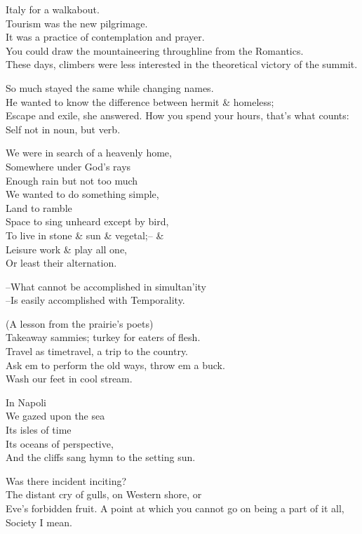 Italy for a walkabout.  \\
Tourism was the new pilgrimage. \\
It was a practice of contemplation and prayer. \\
You could draw the mountaineering throughline from the Romantics. \\
These days, climbers were less interested in the theoretical victory of the summit.

So much stayed the same while changing names. \\
He wanted to know the difference between hermit \& homeless; \\
Escape and exile, she answered.
How you spend your hours, that's what counts: \\
Self not in noun, but verb.

We were in search of a heavenly home, \\
Somewhere under God's rays \\
Enough rain but not too much \\
We wanted to do something simple, \\
Land to ramble \\
Space to sing unheard except by bird, \\
To live in stone \& sun \& vegetal;-- \& \\
Leisure work \& play all one, \\
Or least their alternation.

--What cannot be accomplished in simultan'ity \\
--Is easily accomplished with Temporality.

(A lesson from the prairie's poets) \\
Takeaway sammies; turkey for eaters of flesh. \\
Travel as timetravel, a trip to the country. \\
Ask em to perform the old ways, throw em a buck. \\
Wash our feet in cool stream.

In Napoli \\
We gazed upon the sea \\
Its isles of time \\
Its oceans of perspective, \\
And the cliffs sang hymn to the setting sun.

Was there incident inciting? \\
The distant cry of gulls, on Western shore, or \\
Eve's forbidden fruit. A point at which you cannot go on being a part of it all, \\
Society I mean.

